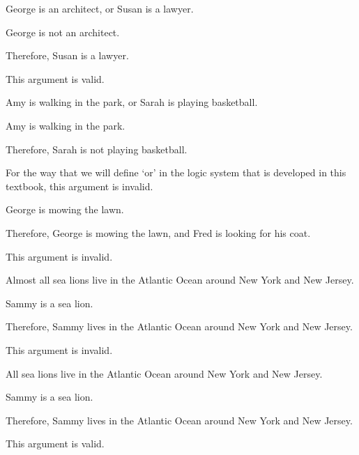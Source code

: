 \begin{enumerate}[(1)]
\item
\begin{earg}
\item George is an architect, or Susan is a lawyer.
\item George is not an architect.
\item Therefore, Susan is a lawyer.
\end{earg}
\noindent This argument is valid.

\item
\begin{earg}
\item Amy is walking in the park, or Sarah is playing basketball.
\item Amy is walking in the park.
\item Therefore, Sarah is not playing basketball.
\end{earg}
\noindent For the way that we will define ‘or’ in the logic system that is developed in this textbook, this argument is invalid.

\noindent\begin{minipage}{0.99\textwidth}
\item
\begin{earg}
\item George is mowing the lawn.
\item Therefore, George is mowing the lawn, and Fred is looking for his coat.
\end{earg}
\noindent This argument is invalid.
\end{minipage}

\item
\begin{earg}
\item Almost all sea lions live in the Atlantic Ocean around New York and New Jersey. 
\item Sammy is a sea lion. 
\item Therefore, Sammy lives in the Atlantic Ocean around New York and New Jersey.
\end{earg}
\noindent This argument is invalid.

\item
\begin{earg}
\item All sea lions live in the Atlantic Ocean around New York and New Jersey. 
\item Sammy is a sea lion. 
\item Therefore, Sammy lives in the Atlantic Ocean around New York and New Jersey.
\end{earg}
\noindent This argument is valid.

\end{enumerate}

